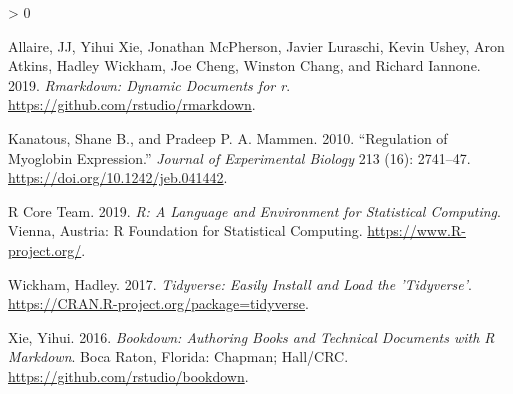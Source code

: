 \documentclass[
]{article}
\newlength{\cslhangindent}
\newenvironment{CSLReferences}[2] %
 {%
  \setlength{\parindent}{0pt}
  \ifodd #1 \everypar{\setlength{\hangindent}{\cslhangindent}}\ignorespaces\fi
  \ifnum #2 > 0
  \setlength{\parskip}{#2\baselineskip}
  \fi
 }%
 {}
\begin{document}
\hypertarget{refs}{}
\begin{CSLReferences}{1}{0}
\leavevmode\hypertarget{ref-markdown1}{}%
Allaire, JJ, Yihui Xie, Jonathan McPherson, Javier Luraschi, Kevin Ushey, Aron Atkins, Hadley Wickham, Joe Cheng, Winston Chang, and Richard Iannone. 2019. \emph{Rmarkdown: Dynamic Documents for r}. \url{https://github.com/rstudio/rmarkdown}.

\leavevmode\hypertarget{ref-Kanatous2741}{}%
Kanatous, Shane B., and Pradeep P. A. Mammen. 2010. {``Regulation of Myoglobin Expression.''} \emph{Journal of Experimental Biology} 213 (16): 2741--47. \url{https://doi.org/10.1242/jeb.041442}.

\leavevmode\hypertarget{ref-R-core}{}%
R Core Team. 2019. \emph{R: A Language and Environment for Statistical Computing}. Vienna, Austria: R Foundation for Statistical Computing. \url{https://www.R-project.org/}.

\leavevmode\hypertarget{ref-tidyverse}{}%
Wickham, Hadley. 2017. \emph{Tidyverse: Easily Install and Load the 'Tidyverse'}. \url{https://CRAN.R-project.org/package=tidyverse}.

\leavevmode\hypertarget{ref-bookdown}{}%
Xie, Yihui. 2016. \emph{Bookdown: Authoring Books and Technical Documents with {R} Markdown}. Boca Raton, Florida: Chapman; Hall/CRC. \url{https://github.com/rstudio/bookdown}.

\end{CSLReferences}
\end{document}
